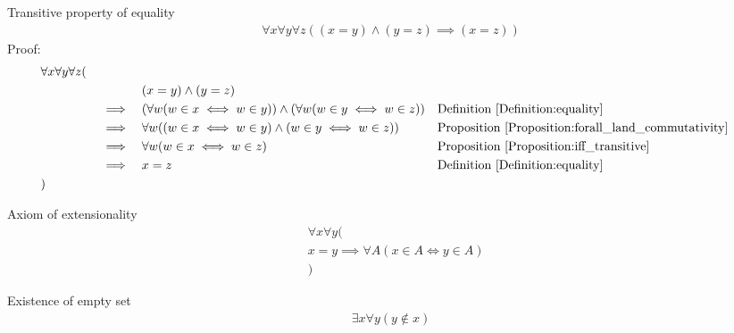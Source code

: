 \begin{prop}
Transitive property of equality
\begin{align*}
\forall x \forall y \forall z ((x = y) \land (y=z) \implies (x=z))
\end{align*}
Proof:
\begin{align*}
& \forall x \forall y \forall z ( \\
& \quad &&  &&  (x = y) \land (y=z) \\
& \quad && \implies && ( \forall w (w \in x \iff w \in y)) \land ( \forall w (w \in y \iff w \in z))
&& \text{Definition \ref{Definition:equality}} \\
& \quad && \implies && \forall w ((w \in x \iff w \in y) \land (w \in y \iff w \in z))
&& \text{Proposition \ref{Proposition:forall_land_commutativity}} \\
& \quad && \implies && \forall w (w \in x \iff w \in z)
&& \text{Proposition \ref{Proposition:iff_transitive}} \\
& \quad && \implies && x = z
&& \text{Definition \ref{Definition:equality}} \\
& )
\end{align*}
\end{prop}

\begin{axm}
Axiom of extensionality
\begin{align*}
& \forall x \forall y ( \\
& x = y \implies \forall A (x \in A  \iff y \in A) \\
& )
\end{align*}
\end{axm}

\begin{axm}
\label{Axiom:existence_of_empty_set}
Existence of empty set
\begin{align*}
\exists x \forall y (y \notin x)
\end{align*}
\end{axm}

